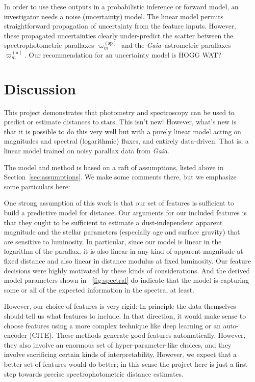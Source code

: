 \documentclass[modern]{aastex62}
\newcommand{\sectionname}{Section}
\newcommand{\project}[1]{\textsl{#1}}
\newcommand{\gaia}{\project{Gaia}}
\newcommand{\gparallax}{\varpi^{(\mathrm{a})}}
\newcommand{\sparallax}{\varpi^{(\mathrm{sp})}}
\begin{document}
In order to use these outputs in a probabilistic inference or forward model,
an investigator needs a noise (uncertainty) model.
The linear model permits straightforward propagation of uncertainty from the
feature inputs.
However, these propagated uncertainties clearly under-predict the scatter between
the spectrophotometric parallaxes $\sparallax_m$ and the \gaia\ astrometric
parallaxes $\gparallax_m$.
Our recommendation for an uncertainty model is HOGG WAT?

\section{Discussion}

This project demonstrates that photometry and spectroscopy can be used to predict
or estimate distances to stars.
This isn't new!
However, what's new is that it is possible to do this very well but with a purely
linear model acting on magnitudes and spectral (logarithmic) fluxes, and entirely
data-driven.
That is, a linear model trained on noisy parallax data from \gaia.

The model and method is based on a raft of assumptions, listed above
in \sectionname~\ref{sec:assumptions}.
We make some comments there, but we emphasize some particulars here:

One strong assumption of this work is that our set of features is sufficient to
build a predictive model for distance.
Our arguments for our included features is that they ought to be sufficient to
estimate a dust-independent apparent magnitude and the stellar parameters (especially
age and surface gravity) that are sensitive to luminosity.
In particular, since our model is linear in the logarithm of the parallax, it is
also linear in any kind of apparent magnitude at fixed distance and also linear
in distance modulus at fixed luminosity.
Our feature decisions were highly motivated by these kinds of considerations.
And the derived model parameters shown in \figurename~\ref{fig:spectral} do indicate that
the model is capturing some or all of the expected information in the spectra, at least.

However, our choice of features is very rigid:
In principle the data themselves should tell us what features to include.
In that direction, it would make sense to choose features using a more complex
technique like deep learning or an auto-encoder (CITE).
These methods generate good features automatically.
However, they also involve an enormous set of hyper-parameter-like choices,
and they involve sacrificing certain kinds of interpretability.
However, we expect that a better set of features would do better; in this sense
the project here is just a first step towards precise spectrophotometric distance
estimates.
\end{document}
